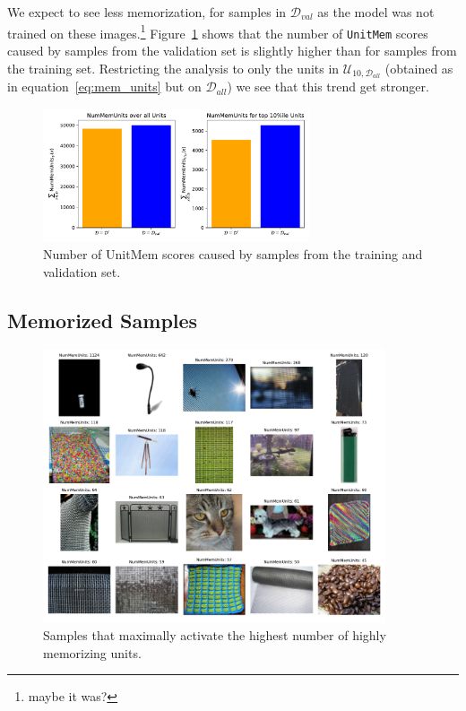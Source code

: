\documentclass{article} %
\begin{document}
We expect to see less memorization, for samples in $\mathcal{D}_{val}$ as the model was not trained on these images.\footnote{maybe it was?}
Figure~\ref{fig:val_respon_num} shows that the number of \texttt{UnitMem} scores caused by samples from the validation set is slightly higher than for samples from the training set.
Restricting the analysis to only the units in $\mathcal{U}_{10,\mathcal{D}_{all}}$ (obtained as in equation~\ref{eq:mem_units} but on $\mathcal{D}_{all}$) we see that this trend get stronger.

\begin{figure}[ht]
   \centering
   \includegraphics[width=0.7\textwidth]{figures/num_mem_units_train_val.pdf}
   \caption{Number of UnitMem scores caused by samples from the training and validation set.}
   \label{fig:val_respon_num}
\end{figure}
\newpage
\subsection{Memorized Samples}
\begin{figure}[ht]
   \centering
   \includegraphics[width=0.9\textwidth]{figures/mem_samples.pdf}
   \caption{Samples that maximally activate the highest number of highly memorizing units.}
   \label{fig:mem_samples}
\end{figure}
\end{document}
